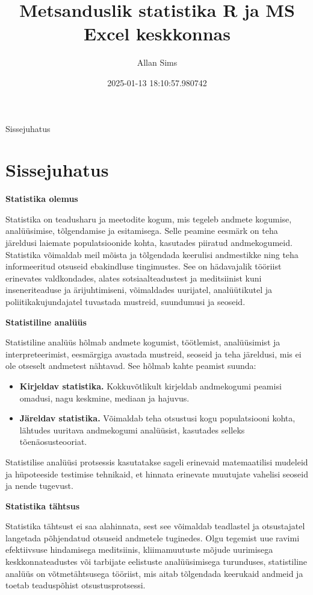 \documentclass[
]{book}
\title{Metsanduslik statistika R ja MS Excel keskkonnas}
\author{Allan Sims}
\date{2025-01-13 18:10:57.980742}
\providecommand{\tightlist}{%
  \setlength{\itemsep}{0pt}\setlength{\parskip}{0pt}}
\begin{document}
\maketitle

{
\setcounter{tocdepth}{1}
\tableofcontents
}
Sissejuhatus

\chapter{Sissejuhatus}\label{sissejuhatus}

\textbf{Statistika olemus}

Statistika on teadusharu ja meetodite kogum, mis tegeleb andmete kogumise, analüüsimise, tõlgendamise ja esitamisega. Selle peamine eesmärk on teha järeldusi laiemate populatsioonide kohta, kasutades piiratud andmekogumeid. Statistika võimaldab meil mõista ja tõlgendada keerulisi andmestikke ning teha informeeritud otsuseid ebakindluse tingimustes. See on hädavajalik tööriist erinevates valdkondades, alates sotsiaalteadustest ja meditsiinist kuni inseneriteaduse ja ärijuhtimiseni, võimaldades uurijatel, analüütikutel ja poliitikakujundajatel tuvastada mustreid, suundumusi ja seoseid.

\textbf{Statistiline analüüs}

Statistiline analüüs hõlmab andmete kogumist, töötlemist, analüüsimist ja interpreteerimist, eesmärgiga avastada mustreid, seoseid ja teha järeldusi, mis ei ole otseselt andmetest nähtavad. See hõlmab kahte peamist suunda:

\begin{itemize}
\tightlist
\item
  \textbf{Kirjeldav statistika.} Kokkuvõtlikult kirjeldab andmekogumi peamisi omadusi, nagu keskmine, mediaan ja hajuvus.
\item
  \textbf{Järeldav statistika.} Võimaldab teha otsustusi kogu populatsiooni kohta, lähtudes uuritava andmekogumi analüüsist, kasutades selleks tõenäosusteooriat.
\end{itemize}

Statistilise analüüsi protsessis kasutatakse sageli erinevaid matemaatilisi mudeleid ja hüpoteeside testimise tehnikaid, et hinnata erinevate muutujate vahelisi seoseid ja nende tugevust.

\textbf{Statistika tähtsus}

Statistika tähtsust ei saa alahinnata, sest see võimaldab teadlastel ja otsustajatel langetada põhjendatud otsuseid andmetele tuginedes. Olgu tegemist uue ravimi efektiivsuse hindamisega meditsiinis, kliimamuutuste mõjude uurimisega keskkonnateadustes või tarbijate eelistuste analüüsimisega turunduses, statistiline analüüs on võtmetähtsusega tööriist, mis aitab tõlgendada keerukaid andmeid ja toetab teaduspõhist otsustusprotsessi.
\end{document}
